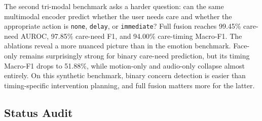 The second tri-modal benchmark asks a harder question: can the same multimodal encoder predict whether the user needs care and whether the appropriate action is \texttt{none}, \texttt{delay}, or \texttt{immediate}? Full fusion reaches 99.45\% care-need AUROC, 97.85\% care-need F1, and 94.00\% care-timing Macro-F1. The ablations reveal a more nuanced picture than in the emotion benchmark. Face-only remains surprisingly strong for binary care-need prediction, but its timing Macro-F1 drops to 51.88\%, while motion-only and audio-only collapse almost entirely. On this synthetic benchmark, binary concern detection is easier than timing-specific intervention planning, and full fusion matters more for the latter.

\subsection{Status Audit}

